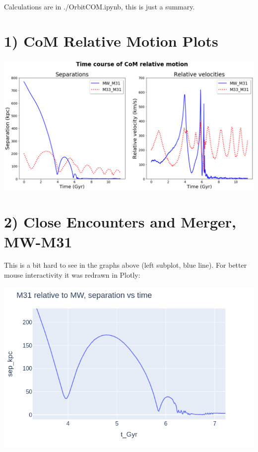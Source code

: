 

\setlength{\parskip}{0.05em}
\setlength{\skip\footins}{20pt}

\newcommand{\hmwkClass}{ASTR 400B}
\newcommand{\hmwkTitle}{Homework 6}
\newcommand{\hmwkDueDate}{March 6, 2020}



	
\maketitle

Calculations are in ./OrbitCOM.ipynb, this is just a summary.

\section*{1) CoM Relative Motion Plots}

{\centering \includegraphics[scale=0.43]{all_pos_v} \par}

\section*{2) Close Encounters and Merger, MW-M31}

This is a bit hard to see in the graphs above (left subplot, blue line). For better mouse interactivity it was redrawn in Plotly:

{\centering \includegraphics[scale=0.42]{M31_MW_zoom} \par}

